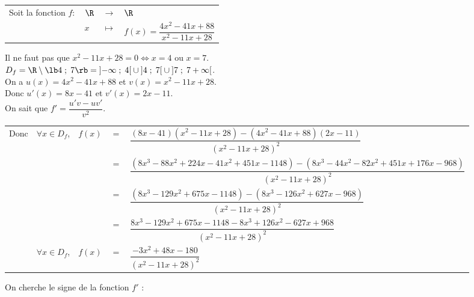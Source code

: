 \begin{tabular}{llll}
Soit la fonction $f :$ & $\R$ & $\longrightarrow$ & $\R$ \\
& $x$ & $\longmapsto$ & $f(x) = \dfrac{4x^2 - 41x + 88}{x^2 - 11x + 28}$ \\
\end{tabular}

\vspace*{.3cm}

Il ne faut pas que $x^2 - 11x + 28 = 0 \Longleftrightarrow x= 4$ ou $x = 7$. \\

$D_f = \R \setminus \lb 4 \; ; \; 7 \rb = \left]-\infty \; ; \; 4\right[\cup\left]4 \; ; \; 7\right[\cup\left]7\; ; \; 7+\infty\right[$. \\

On a $u(x) = 4x^2 - 41x + 88$ et $v(x) = x^2 - 11x + 28$. \\
Donc $u'(x) = 8x - 41$ et $v'(x) = 2x - 11$. \\

On sait que $f' = \dfrac{u'v - uv'}{v^2}$.

\begin{tabular}{lllll}
Donc & $\forall x \in D_f$, & $f(x)$ & $=$ & $\dfrac{\left(8x - 41\right)\left(x^2 - 11x + 28\right)-\left(4x^2 - 41x + 88\right)\left(2x - 11\right)}{\left(x^2 - 11x + 28\right)^2}$ \vspace*{.3cm} \\
& & & $=$ & $\dfrac{\left(8x^3 - 88x^2 + 224x - 41x^2 + 451x - 1148\right)-\left(8x^3 - 44x^2 - 82x^2 + 451x + 176x - 968\right)}{\left(x^2 - 11x + 28\right)^2}$ \vspace*{.3cm} \\
& & & $=$ & $\dfrac{\left(8x^3 - 129x^2 + 675x - 1148\right)-\left(8x^3 - 126x^2 + 627x - 968\right)}{\left(x^2 - 11x + 28\right)^2}$ \vspace*{.3cm} \\
& & & $=$ & $\dfrac{8x^3 - 129x^2 + 675x - 1148 - 8x^3 + 126x^2 - 627x + 968}{\left(x^2 - 11x + 28\right)^2}$ \vspace*{.3cm} \\
& $\forall x \in D_f$, & $f(x)$ & $=$ & $\dfrac{-3x^2 + 48x - 180}{\left(x^2 - 11x + 28\right)^2}$ \vspace*{.3cm} \\
\end{tabular}

On cherche le signe de la fonction $f'$ : \\


